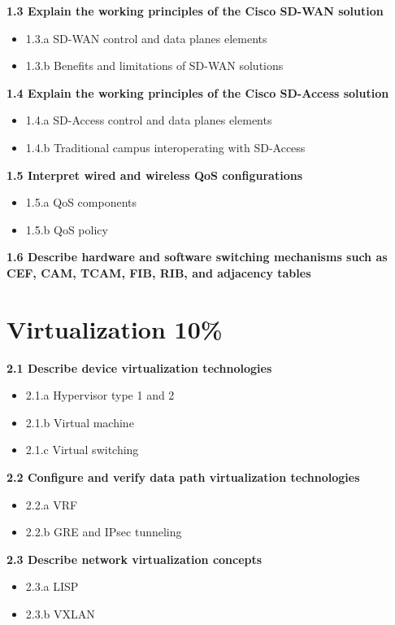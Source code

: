 \documentclass{article}
\begin{document}
\noindent\textbf{1.3 Explain the working principles of the Cisco SD-WAN solution}
\begin{itemize}
\item 1.3.a SD-WAN control and data planes elements
\item 1.3.b Benefits and limitations of SD-WAN solutions
\end{itemize}

\noindent\textbf{1.4 Explain the working principles of the Cisco SD-Access solution}
\begin{itemize}
\item 1.4.a SD-Access control and data planes elements
\item 1.4.b Traditional campus interoperating with SD-Access
\end{itemize}

\noindent\textbf{1.5 Interpret wired and wireless QoS configurations}
\begin{itemize}
\item 1.5.a QoS components
\item 1.5.b QoS policy
\end{itemize}

\noindent\textbf{1.6 Describe hardware and software switching mechanisms such as CEF, CAM, TCAM, FIB, RIB, and adjacency tables}\\

\newpage
\section{Virtualization 10\%}
\textbf{2.1 Describe device virtualization technologies}
\begin{itemize}
\item 2.1.a Hypervisor type 1 and 2
\item 2.1.b Virtual machine
\item 2.1.c Virtual switching
\end{itemize}

\noindent\textbf{2.2 Configure and verify data path virtualization technologies}
\begin{itemize}
\item 2.2.a VRF
\item 2.2.b GRE and IPsec tunneling
\end{itemize}

\noindent\textbf{2.3 Describe network virtualization concepts}
\begin{itemize}
\item 2.3.a LISP
\item 2.3.b VXLAN
\end{itemize}
\end{document}
